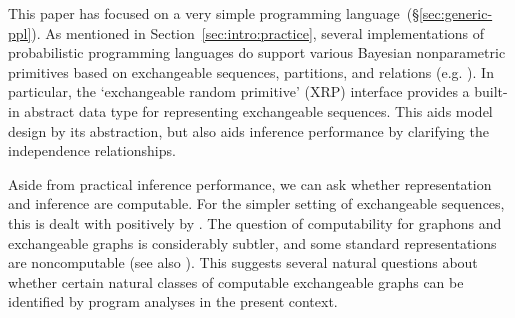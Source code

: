 This paper has focused on a very simple programming language~(\S\ref{sec:generic-ppl}).
As mentioned in Section~\ref{sec:intro:practice},
several implementations of probabilistic programming languages do support various Bayesian nonparametric primitives based on exchangeable sequences, partitions, and relations
(e.g. \cite{wood-aistats-2014,goodman2008church,roy2008stochastic,ks-prob-first-class-store,lazyppl,msp-venture}).
In particular, the `exchangeable random primitive' (XRP) interface
\cite{XRP-PPS2016,wu-church} 
provides a built-in abstract data type for representing exchangeable sequences.
This aids model design by its abstraction, but also aids inference performance by clarifying the independence relationships. 

Aside from practical inference performance, we can ask whether representation and inference are computable.
For the simpler setting of exchangeable sequences, this is dealt with positively by  \cite{freer2012computable, pmlr-v9-freer10a}.
The question of computability for graphons and exchangeable graphs is considerably subtler,
and some standard representations are noncomputable
\cite{ackerman2019algorithmic} (see also \cite{CompExch-PPS2017}).
This suggests several natural questions about whether certain natural classes of computable exchangeable graphs
can be identified by program analyses in the present context.%




